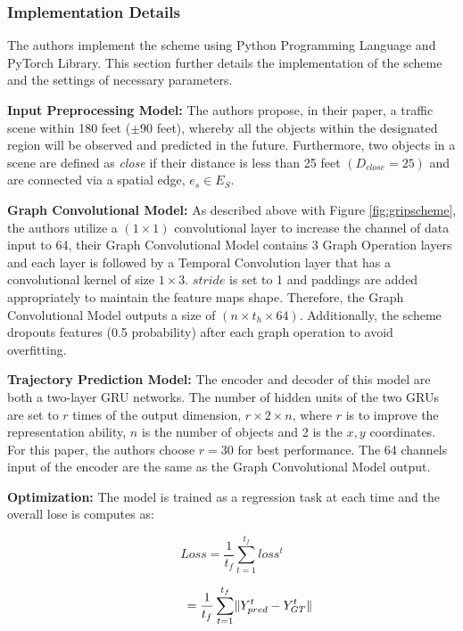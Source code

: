 \subsubsection{Implementation Details}

\tab The authors implement the scheme using Python Programming Language and PyTorch Library. This section further details the implementation of the scheme and the settings of necessary parameters.

\tab \textbf{Input Preprocessing Model:} The authors propose, in their paper, a traffic scene within 180 feet (\(\pm 90\) feet), whereby all the objects within the designated region will be observed and predicted in the future. Furthermore, two objects in a scene are defined as \textit{close} if their distance is less than 25 feet \((D_{close} = 25)\) and are connected via a spatial edge, \(e_s \in E_S\). 

\tab \textbf{Graph Convolutional Model:} As described above with Figure \ref{fig:gripscheme}, the authors utilize a \((1 \times 1)\) convolutional layer to increase the channel of data input to 64, their Graph Convolutional Model contains 3 Graph Operation layers and each layer is followed by a Temporal Convolution layer that has a convolutional kernel of size \(1 \times 3\). \(stride\) is set to 1 and paddings are added appropriately to maintain the feature maps shape. Therefore, the Graph Convolutional Model outputs a size of \((n \times t_h \times 64)\). Additionally, the scheme dropouts features (0.5 probability) after each graph operation to avoid overfitting. 

\tab \textbf{Trajectory Prediction Model:} The encoder and decoder of this model are both a two-layer GRU networks. The number of hidden units of the two GRUs are set to \(r\) times of the output dimension, \(r \times 2 \times n\), where \(r\) is to improve the representation ability, \(n\) is the number of objects and 2 is the \(x,y\) coordinates. For this paper, the authors choose \(r=30\) for best performance. The 64 channels input of the encoder are the same as the Graph Convolutional Model output.

\tab \textbf{Optimization:} The model is trained as a regression task at each time and the overall lose is computes as:

\begin{equation}
    Loss =  \dfrac{1}{t_f} \sum_{t=1}^{t_f} loss^t
\end{equation}

\begin{equation}
          \hspace*{1cm} = \dfrac{1}{t_f} \sum_{t=1}^{t_f} \lVert {Y_{pred}^t - Y_{GT}^t} \rVert
\end{equation}

